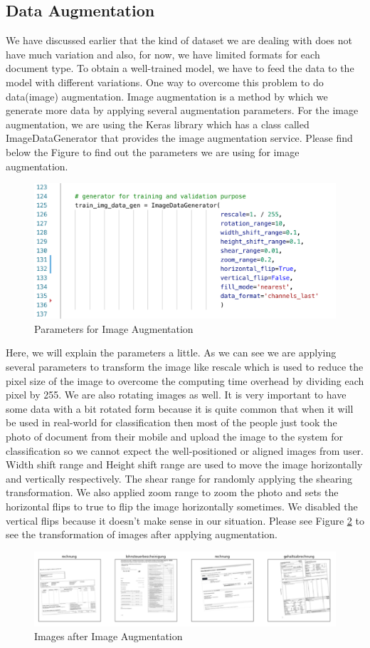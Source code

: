 \subsection{Data Augmentation}
We have discussed earlier that the kind of dataset we are dealing with does not have much variation and also, for now, we have limited formats for each document type. To obtain a well-trained model, we have to feed the data to the model with different variations. One way to overcome this problem to do data(image) augmentation. Image augmentation is a method by which we generate more data by applying several augmentation parameters. For the image augmentation, we are using the Keras library \cite{keras} which has a class called ImageDataGenerator \cite{keras_ip} that provides the image augmentation service. Please find below the Figure to find out the parameters we are using for image augmentation.
\begin{figure}[H]
\centering
\includegraphics[scale=0.6]{images/Chapter3/augmentation_metrics.png}
\caption{Parameters for Image Augmentation}
\label{ia_params}
\end{figure}
\par
Here, we will explain the parameters a little. As we can see we are applying several parameters to transform the image like rescale which is used to reduce the pixel size of the image to overcome the computing time overhead by dividing each pixel by 255. We are also rotating images as well. It is very important to have some data with a bit rotated form because it is quite common that when it will be used in real-world for classification then most of the people just took the photo of document from their mobile and upload the image to the system for classification so we cannot expect the well-positioned or aligned images from user. Width shift range and Height shift range are used to move the image horizontally and vertically respectively. The shear range for randomly applying the shearing transformation. We also applied zoom range to zoom the photo and sets the horizontal flips to true to flip the image horizontally sometimes. We disabled the vertical flips because it doesn't make sense in our situation. Please see Figure \ref{aug_data} to see the transformation of images after applying augmentation.
\begin{figure}[H]
\centering
\includegraphics[scale=0.7]{images/Chapter3/augmented_data.png}
\caption{Images after Image Augmentation}
\label{aug_data}
\end{figure}